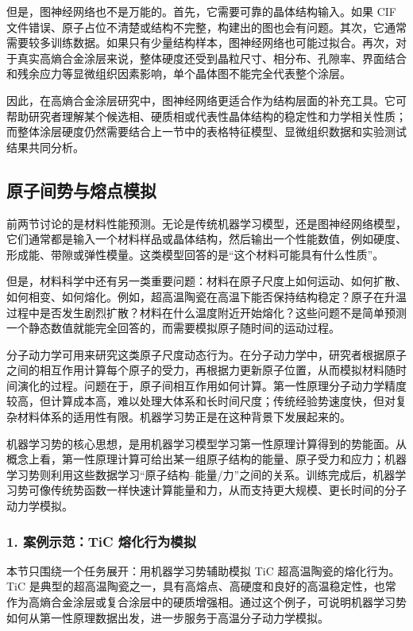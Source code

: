 但是，图神经网络也不是万能的。首先，它需要可靠的晶体结构输入。如果 CIF 文件错误、原子占位不清楚或结构不完整，构建出的图也会有问题。其次，它通常需要较多训练数据。如果只有少量结构样本，图神经网络也可能过拟合。再次，对于真实高熵合金涂层来说，整体硬度还受到晶粒尺寸、相分布、孔隙率、界面结合和残余应力等显微组织因素影响，单个晶体图不能完全代表整个涂层。


因此，在高熵合金涂层研究中，图神经网络更适合作为结构层面的补充工具。它可帮助研究者理解某个候选相、硬质相或代表性晶体结构的稳定性和力学相关性质；而整体涂层硬度仍然需要结合上一节中的表格特征模型、显微组织数据和实验测试结果共同分析。


\subsection{原子间势与熔点模拟}

前两节讨论的是材料性能预测。无论是传统机器学习模型，还是图神经网络模型，它们通常都是输入一个材料样品或晶体结构，然后输出一个性能数值，例如硬度、形成能、带隙或弹性模量。这类模型回答的是“这个材料可能具有什么性质”。


但是，材料科学中还有另一类重要问题：材料在原子尺度上如何运动、如何扩散、如何相变、如何熔化。例如，超高温陶瓷在高温下能否保持结构稳定？原子在升温过程中是否发生剧烈扩散？材料在什么温度附近开始熔化？这些问题不是简单预测一个静态数值就能完全回答的，而需要模拟原子随时间的运动过程。


分子动力学可用来研究这类原子尺度动态行为。在分子动力学中，研究者根据原子之间的相互作用计算每个原子的受力，再根据力更新原子位置，从而模拟材料随时间演化的过程。问题在于，原子间相互作用如何计算。第一性原理分子动力学精度较高，但计算成本高，难以处理大体系和长时间尺度；传统经验势速度快，但对复杂材料体系的适用性有限。机器学习势正是在这种背景下发展起来的。


机器学习势的核心思想，是用机器学习模型学习第一性原理计算得到的势能面。从概念上看，第一性原理计算可给出某一组原子结构的能量、原子受力和应力；机器学习势则利用这些数据学习“原子结构--能量/力”之间的关系。训练完成后，机器学习势可像传统势函数一样快速计算能量和力，从而支持更大规模、更长时间的分子动力学模拟。


\subsubsection*{\textbf{1. 案例示范：TiC 熔化行为模拟}}

本节只围绕一个任务展开：用机器学习势辅助模拟 TiC 超高温陶瓷的熔化行为。TiC 是典型的超高温陶瓷之一，具有高熔点、高硬度和良好的高温稳定性，也常作为高熵合金涂层或复合涂层中的硬质增强相。通过这个例子，可说明机器学习势如何从第一性原理数据出发，进一步服务于高温分子动力学模拟。


